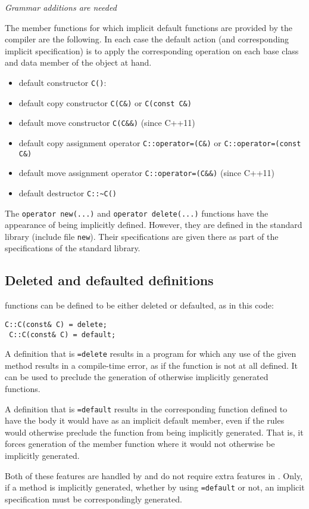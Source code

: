 \emph{Grammar additions are needed}

The member functions for which implicit default functions are provided by the compiler are the following. In each case the default action (and corresponding implicit specification) is to apply the corresponding operation on each base class and data member of the object at hand.
\begin{itemize}
	\item default constructor \lstinline|C()|: 
	\item default copy constructor \lstinline|C(C&)| or \lstinline|C(const C&)|
	\item default move constructor \lstinline|C(C&&)| (since C++11)
	\item default copy assignment operator \lstinline|C::operator=(C&)| or \lstinline|C::operator=(const C&)|
	\item default move assignment operator \lstinline|C::operator=(C&&)| (since C++11)
	\item default destructor \lstinline|C::~C()|
\end{itemize}


The \lstinline|operator new(...)| and 
\lstinline|operator delete(...)| functions have the appearance of being implicitly defined. However, they are defined in the standard library
(include file \lstinline|new|). Their specifications are given there as
part of the specifications of the standard library.

\subsection{Deleted and defaulted definitions}

 \lang functions can be defined to be either deleted or defaulted, as in this code:
 \begin{lstlisting}[deletekeywords={default}]
 C::C(const& C) = delete; 
 C::C(const& C) = default; 
 \end{lstlisting}
 A definition that is \lstinline|=delete| results in a program for which any use of the given method results in a compile-time error,
 as if the function is not at all defined. It can be used to preclude the
 generation of otherwise implicitly generated functions.
 
 A definition that is \lstinline|=default| results in the corresponding
 function defined to have the body it would have as an implicit default
 member, even if the \lang rules would otherwise preclude the 
 function from being implicitly generated. That is, it forces 
 generation of the member function where it would not otherwise be implicitly generated.
 
Both of these features are handled by \lang and do not require 
extra features in \NAME. Only, if a method is implicitly generated, whether by using \lstinline|=default| or not, an implicit specification must be correspondingly generated.
